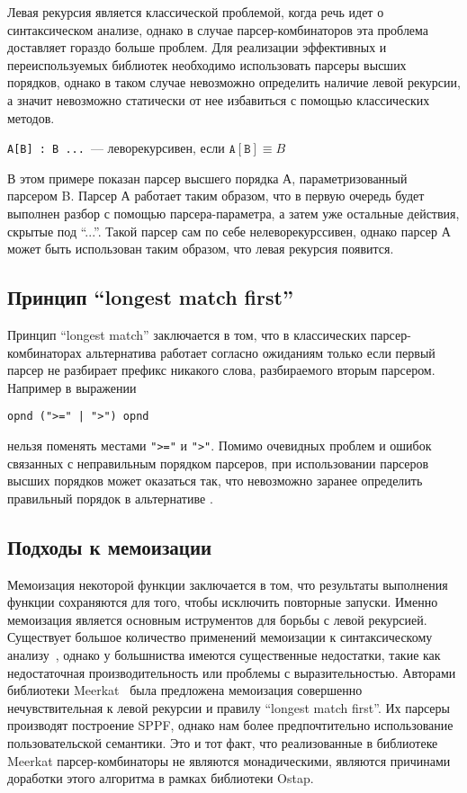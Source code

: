 \documentclass[conference]{IEEEtran}
\begin{document}
Левая рекурсия является классической проблемой, когда речь идет о синтаксическом анализе, однако в случае парсер-комбинаторов эта проблема доставляет гораздо больше проблем. Для реализации эффективных и переиспользуемых библиотек необходимо использовать парсеры высших порядков, однако в таком случае невозможно определить наличие левой рекурсии, а значит невозможно статически от нее избавиться с помощью классических методов.

\begin{center}
    \texttt{A[B] : B ...}~--- леворекурсивен, если $\mathtt{A[B]} \equiv B$
  \end{center}

В этом примере показан парсер высшего порядка А, параметризованный парсером B. Парсер А работает таким образом, что в первую очередь будет выполнен разбор с помощью парсера-параметра, а затем уже остальные действия, скрытые под ``...''. Такой парсер сам по себе нелеворекурссивен, однако парсер А может быть использован таким образом, что левая рекурсия появится.

\subsection{Принцип ``longest match first''}

Принцип ``longest match'' заключается в том, что в классических парсер-комбинаторах альтернатива работает согласно ожиданиям только если первый парсер не разбирает префикс никакого слова, разбираемого вторым парсером. Например в выражении

  \begin{center}
    \verb/opnd (">=" | ">") opnd/
  \end{center}

нельзя поменять местами \verb/">="/ и \verb/">"/. Помимо очевидных проблем и ошибок связанных с неправильным порядком парсеров, при использовании парсеров высших порядков может оказаться так, что невозможно заранее определить правильный порядок в альтернативе
.
\subsection{Подходы к мемоизации}
Мемоизация некоторой функции заключается в том, что результаты выполнения функции сохраняются для того, чтобы исключить повторные запуски. Именно мемоизация является основным иструментов для борьбы с левой рекурсией. Существует большое количество применений мемоизации к синтаксическому анализу~\cite{frost,tratt,warth}, однако у большниства имеются существенные недостатки, такие как недостаточная производительность или проблемы с выразительностью. Авторами библиотеки Meerkat~\cite{meerkat} была предложена мемоизация совершенно нечувствительная к левой рекурсии и правилу ``longest match first''. Их парсеры производят построение SPPF, однако нам более предпочтительно использование пользовательской семантики. Это и тот факт, что реализованные в библиотеке Meerkat парсер-комбинаторы не являются монадическими, являются причинами доработки этого алгоритма в рамках библиотеки Ostap.
\end{document}
